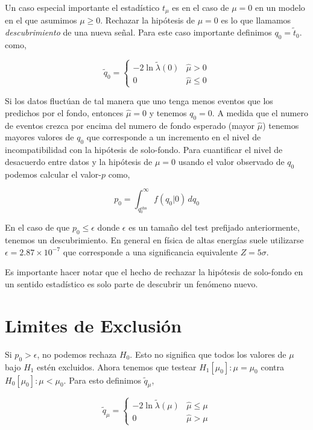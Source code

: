 Un caso especial importante el estadístico $t_\mu$ es en el caso de $\mu=0$ en un
modelo en el que asumimos $\mu \geq 0$. Rechazar la hipótesis de $\mu=0$ es lo
que llamamos \emph{descubrimiento} de una nueva señal. Para este caso importante
definimos $q_0=\tilde{t}_0$. como,

\begin{equation}
  \tilde{q}_0 =
  \begin{cases}
    -2 \ln \tilde{\lambda}(0) & \hat{\mu} > 0 \\ 0 & \hat{\mu} \leq 0
  \end{cases}
\end{equation}

Si los datos fluctúan de tal manera que uno tenga menos eventos que los
predichos por el fondo, entonces $\hat{\mu} = 0$ y tenemos $q_0=0$. A medida que
el numero de eventos crezca por encima del numero de fondo esperado (mayor
$\hat{\mu}$) tenemos mayores valores de $q_0$ que corresponde a un incremento en
el nivel de incompatibilidad con la hipótesis de solo-fondo. Para cuantificar el
nivel de desacuerdo entre datos y la hipótesis de $\mu=0$ usando el valor
observado de $q_0$ podemos calcular el valor-$p$ como,

\begin{equation}
  p_0 = \int_{q_{0}^\text{obs}}^{\infty} f(q_0|0) \, dq_0
  \label{eq:p0}
\end{equation}

En el caso de que $p_0 \leq \epsilon$ donde $\epsilon$ es un tamaño del test
prefijado anteriormente, tenemos un descubrimiento. En general en física de
altas energías suele utilizarse $\epsilon = 2.87 \times 10^{-7}$ que corresponde
a una significancia equivalente $Z=5\sigma$.

Es importante hacer notar que el hecho de rechazar la hipótesis de solo-fondo en
un sentido estadístico es solo parte de descubrir un fenómeno nuevo.


\section{Limites de Exclusión}

Si $p_0> \epsilon$, no podemos rechaza $H_0$. Esto no significa que todos los
valores de $\mu$ bajo $H_1$ estén excluidos. Ahora tenemos que testear
$H_1[\mu_0]: \mu = \mu_0$ contra $H_0[\mu_0]: \mu < \mu_0$. Para esto definimos
$\tilde{q}_\mu$,

\begin{equation}
  \tilde{q}_\mu =
  \begin{cases}
    -2 \ln \tilde{\lambda}(\mu) & \hat{\mu} \leq \mu \\ 0 & \hat{\mu} > \mu
  \end{cases} \label{eq:qmu}
\end{equation}

